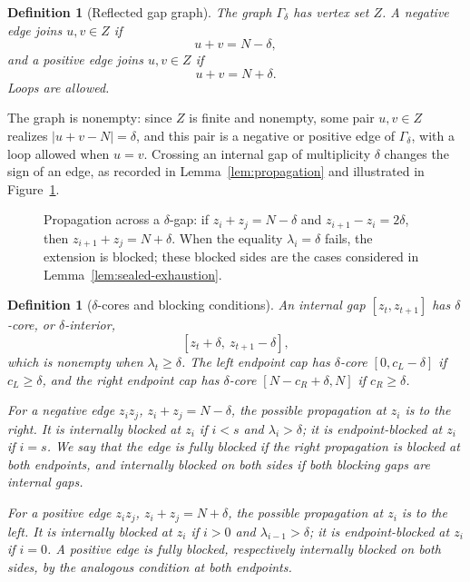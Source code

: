 \documentclass[11pt]{article}
\newtheorem{definition}[theorem]{Definition}
\begin{document}
\begin{definition}[Reflected gap graph]
The graph $\Gamma_\delta$ has vertex set $Z$.  A negative edge joins $u,v\in Z$ if
\[
        u+v=N-\delta,
\]
and a positive edge joins $u,v\in Z$ if
\[
        u+v=N+\delta.
\]
Loops are allowed.

\end{definition}



The graph is nonempty: since $Z$ is finite and nonempty, some pair $u,v\in Z$ realizes $|u+v-N|=\delta$, and this pair is a negative or positive edge of $\Gamma_\delta$, with a loop allowed when $u=v$.  Crossing an internal gap of multiplicity $\delta$ changes the sign of an edge, as recorded in Lemma~\ref{lem:propagation} and illustrated in Figure~\ref{fig:gap-propagation}.

\begin{figure}[H]
\centering
{}
\caption{Propagation across a $\delta$-gap: if $z_i+z_j=N-\delta$ and $z_{i+1}-z_i=2\delta$, then $z_{i+1}+z_j=N+\delta$.  When the equality $\lambda_i=\delta$ fails, the extension is blocked; these blocked sides are the cases considered in Lemma~\ref{lem:sealed-exhaustion}.}
\label{fig:gap-propagation}
\end{figure}

\begin{definition}[$\delta$-cores and blocking conditions]\label{def:blocked}
An internal gap $[z_t,z_{t+1}]$ has $\delta$-core, or $\delta$-interior,
\[
        [z_t+\delta,\ z_{t+1}-\delta],
\]
which is nonempty when $\lambda_t\ge\delta$.
The left endpoint cap has $\delta$-core $[0,c_L-\delta]$ if $c_L\ge\delta$, and the right endpoint cap has $\delta$-core $[N-c_R+\delta,N]$ if $c_R\ge\delta$.

For a negative edge $z_i z_j$, $z_i+z_j=N-\delta$, the possible propagation at $z_i$ is to the right.  It is internally blocked at $z_i$ if $i<s$ and $\lambda_i>\delta$; it is endpoint-blocked at $z_i$ if $i=s$.  We say that the edge is fully blocked if the right propagation is blocked at both endpoints, and internally blocked on both sides if both blocking gaps are internal gaps.

For a positive edge $z_i z_j$, $z_i+z_j=N+\delta$, the possible propagation at $z_i$ is to the left.  It is internally blocked at $z_i$ if $i>0$ and $\lambda_{i-1}>\delta$; it is endpoint-blocked at $z_i$ if $i=0$.  A positive edge is fully blocked, respectively internally blocked on both sides, by the analogous condition at both endpoints.
\end{definition}
\end{document}
